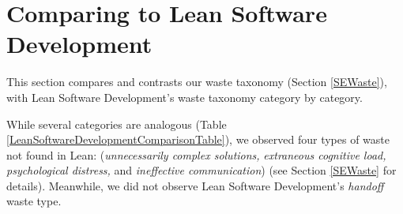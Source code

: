 



\section{Comparing to Lean Software Development}
\label{LeanSoftwareDevelopmentComparison}

This section compares and contrasts our waste taxonomy (Section \ref{SEWaste}), with Lean Software Development's waste taxonomy \cite{PoppendieckConceptToCash} category by category. 

While several categories are analogous (Table \ref{LeanSoftwareDevelopmentComparisonTable}), we observed four types of waste not found in Lean: (\textit{unnecessarily complex solutions,} \textit{extraneous cognitive load,} \textit{psychological distress,} and \textit{ineffective communication}) (see Section \ref{SEWaste} for details). Meanwhile, we did not observe Lean Software Development's \textit{handoff} waste type.



